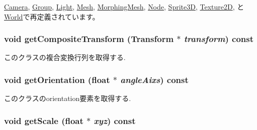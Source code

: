 \hyperlink{classm3g_1_1Camera_8aad1ceab4c2a03609c8a42324ce484d}{Camera}, \hyperlink{classm3g_1_1Group_8aad1ceab4c2a03609c8a42324ce484d}{Group}, \hyperlink{classm3g_1_1Light_8aad1ceab4c2a03609c8a42324ce484d}{Light}, \hyperlink{classm3g_1_1Mesh_82cfeb67ca66b93e2ca7bda9a4f0e2aa}{Mesh}, \hyperlink{classm3g_1_1MorphingMesh_8aad1ceab4c2a03609c8a42324ce484d}{MorphingMesh}, \hyperlink{classm3g_1_1Node_8aad1ceab4c2a03609c8a42324ce484d}{Node}, \hyperlink{classm3g_1_1Sprite3D_8aad1ceab4c2a03609c8a42324ce484d}{Sprite3D}, \hyperlink{classm3g_1_1Texture2D_82cfeb67ca66b93e2ca7bda9a4f0e2aa}{Texture2D}, と \hyperlink{classm3g_1_1World_8aad1ceab4c2a03609c8a42324ce484d}{World}で再定義されています。\hypertarget{classm3g_1_1Transformable_263ef66efed11b7f9678e2e4bbec4c55}{
\subsubsection[{getCompositeTransform}]{\setlength{\rightskip}{0pt plus 5cm}void getCompositeTransform ({\bf Transform} $\ast$ {\em transform}) const}}
\label{classm3g_1_1Transformable_263ef66efed11b7f9678e2e4bbec4c55}


このクラスの複合変換行列を取得する. \hypertarget{classm3g_1_1Transformable_f4df4d4858762f23a5562f7192e6d53c}{
\subsubsection[{getOrientation}]{\setlength{\rightskip}{0pt plus 5cm}void getOrientation (float $\ast$ {\em angleAixs}) const}}
\label{classm3g_1_1Transformable_f4df4d4858762f23a5562f7192e6d53c}


このクラスのorientation要素を取得する. \hypertarget{classm3g_1_1Transformable_b8a2dd11d0ba90e138625eb86a6a6083}{
\subsubsection[{getScale}]{\setlength{\rightskip}{0pt plus 5cm}void getScale (float $\ast$ {\em xyz}) const}}
\label{classm3g_1_1Transformable_b8a2dd11d0ba90e138625eb86a6a6083}


